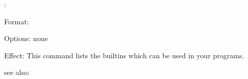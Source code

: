 \builtins:

Format: 

Options: none

Effect: This command lists the \RELFUN{} builtins which can be used
	in your \RELFUN{} programs.

see also: \listing
